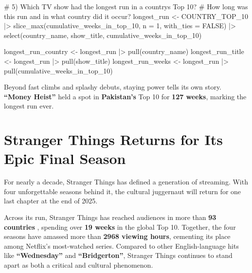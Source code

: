 \documentclass[
  12pt,
  letterpaper,
  DIV=11,
  numbers=noendperiod]{scrartcl}
\newenvironment{Shaded}{\begin{snugshade}}{\end{snugshade}}
\newcommand{\AttributeTok}[1]{\textcolor[rgb]{0.40,0.45,0.13}{#1}}
\newcommand{\CommentTok}[1]{\textcolor[rgb]{0.37,0.37,0.37}{#1}}
\newcommand{\ConstantTok}[1]{\textcolor[rgb]{0.56,0.35,0.01}{#1}}
\newcommand{\DecValTok}[1]{\textcolor[rgb]{0.68,0.00,0.00}{#1}}
\newcommand{\FunctionTok}[1]{\textcolor[rgb]{0.28,0.35,0.67}{#1}}
\newcommand{\NormalTok}[1]{\textcolor[rgb]{0.00,0.23,0.31}{#1}}
\newcommand{\OtherTok}[1]{\textcolor[rgb]{0.00,0.23,0.31}{#1}}
\newcommand{\SpecialCharTok}[1]{\textcolor[rgb]{0.37,0.37,0.37}{#1}}
\begin{document}
\begin{Shaded}
\begin{Highlighting}[]
\CommentTok{\# 5) Which TV show had the longest run in a country\textquotesingle{}s Top 10? }
\CommentTok{\# How long was this run and in what country did it occur?}
\NormalTok{longest\_run }\OtherTok{\textless{}{-}}\NormalTok{ COUNTRY\_TOP\_10 }\SpecialCharTok{|\textgreater{}} 
  \FunctionTok{slice\_max}\NormalTok{(cumulative\_weeks\_in\_top\_10, }\AttributeTok{n =} \DecValTok{1}\NormalTok{, }\AttributeTok{with\_ties =} \ConstantTok{FALSE}\NormalTok{) }\SpecialCharTok{|\textgreater{}} 
  \FunctionTok{select}\NormalTok{(country\_name, show\_title, cumulative\_weeks\_in\_top\_10)}

\NormalTok{longest\_run\_country }\OtherTok{\textless{}{-}}\NormalTok{ longest\_run }\SpecialCharTok{|\textgreater{}} \FunctionTok{pull}\NormalTok{(country\_name)}
\NormalTok{longest\_run\_title }\OtherTok{\textless{}{-}}\NormalTok{ longest\_run }\SpecialCharTok{|\textgreater{}} \FunctionTok{pull}\NormalTok{(show\_title)}
\NormalTok{longest\_run\_weeks }\OtherTok{\textless{}{-}}\NormalTok{ longest\_run }\SpecialCharTok{|\textgreater{}} \FunctionTok{pull}\NormalTok{(cumulative\_weeks\_in\_top\_10)}
\end{Highlighting}
\end{Shaded}

Beyond fast climbs and splashy debuts, staying power tells its own
story. \textbf{``Money Heist''} held a spot in \textbf{Pakistan's} Top
10 for \textbf{127 weeks}, marking the longest run ever.

\section{Stranger Things Returns for Its Epic Final
Season}\label{stranger-things-returns-for-its-epic-final-season}

For nearly a decade, Stranger Things has defined a generation of
streaming. With four unforgettable seasons behind it, the cultural
juggernaut will return for one last chapter at the end of 2025.

Across its run, Stranger Things has reached audiences in more than
\textbf{\label{st_total_countries}{93 countries} },
spending over \textbf{\label{st_total_weeks}{19 weeks}}
in the global Top 10. Together, the four seasons have amassed more than
\textbf{\label{st_total_views}{2968 viewing hours}},
cementing its place among Netflix's most-watched series. Compared to
other English-language hits like
\textbf{``\label{top_show_1}{Wednesday}''} and
\textbf{``\label{top_show_2}{Bridgerton}''}, Stranger
Things continues to stand apart as both a critical and cultural
phenomenon.
\end{document}
